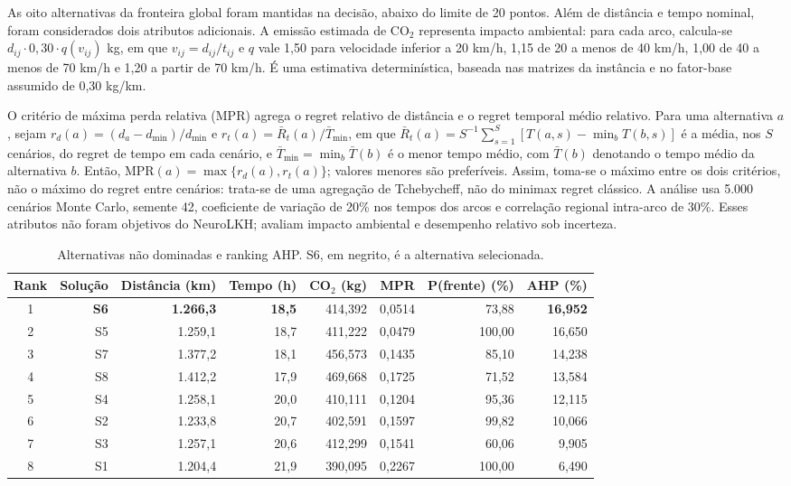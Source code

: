 \documentclass[conference]{IEEEtran}
\begin{document}
As oito alternativas da fronteira global foram mantidas na decisão, abaixo
do limite de 20 pontos. Além de distância e tempo nominal, foram considerados
dois atributos adicionais. A emissão estimada de CO$_2$ representa impacto
ambiental: para cada arco, calcula-se
$d_{ij}\cdot0{,}30\cdot q(v_{ij})$ kg, em que $v_{ij}=d_{ij}/t_{ij}$ e
$q$ vale 1,50 para velocidade inferior a 20 km/h, 1,15 de 20 a menos de
40 km/h, 1,00 de 40 a menos de 70 km/h e 1,20 a partir de 70 km/h. É uma
estimativa determinística, baseada nas matrizes da instância e no fator-base
assumido de 0,30 kg/km.

O critério de máxima perda relativa (MPR) agrega o regret relativo de distância
e o regret temporal médio relativo. Para uma alternativa $a$, sejam
$r_d(a)=(d_a-d_{\min})/d_{\min}$ e
$r_t(a)=\bar{R}_t(a)/\bar{T}_{\min}$, em que
$\bar{R}_t(a)=S^{-1}\sum_{s=1}^{S}[T(a,s)-\min_b T(b,s)]$ é a média, nos
$S$ cenários, do regret de tempo em cada cenário, e
$\bar{T}_{\min}=\min_b\bar{T}(b)$ é o menor tempo médio, com $\bar{T}(b)$
denotando o tempo médio da alternativa $b$. Então,
$\mathrm{MPR}(a)=\max\{r_d(a),r_t(a)\}$; valores menores são preferíveis.
Assim, toma-se o máximo entre os dois critérios, não o máximo do regret entre
cenários: trata-se de uma agregação de Tchebycheff, não do minimax regret
clássico. A análise usa 5.000 cenários Monte Carlo, semente 42, coeficiente de
variação de 20\% nos tempos dos arcos e correlação regional intra-arco de 30\%.
Esses atributos não foram objetivos do NeuroLKH; avaliam impacto ambiental e
desempenho relativo sob incerteza.

\begin{table}[t]
\centering
\caption{Alternativas não dominadas e ranking AHP. S6, em negrito, é a alternativa selecionada.}
\label{tab:alternativas}
\small
\begin{tabular}{crrrrrrr}
\toprule
Rank & Solução & Distância (km) & Tempo (h) & CO$_2$ (kg) & MPR & P(frente) (\%) & AHP (\%)\\
\midrule
1 & \textbf{S6} & \textbf{1.266,3} & \textbf{18,5} & 414,392 & 0,0514 & 73,88 & \textbf{16,952}\\
2 & S5 & 1.259,1 & 18,7 & 411,222 & 0,0479 & 100,00 & 16,650\\
3 & S7 & 1.377,2 & 18,1 & 456,573 & 0,1435 & 85,10 & 14,238\\
4 & S8 & 1.412,2 & 17,9 & 469,668 & 0,1725 & 71,52 & 13,584\\
5 & S4 & 1.258,1 & 20,0 & 410,111 & 0,1204 & 95,36 & 12,115\\
6 & S2 & 1.233,8 & 20,7 & 402,591 & 0,1597 & 99,82 & 10,066\\
7 & S3 & 1.257,1 & 20,6 & 412,299 & 0,1541 & 60,06 & 9,905\\
8 & S1 & 1.204,4 & 21,9 & 390,095 & 0,2267 & 100,00 & 6,490\\
\bottomrule
\end{tabular}
\end{table}
\end{document}
